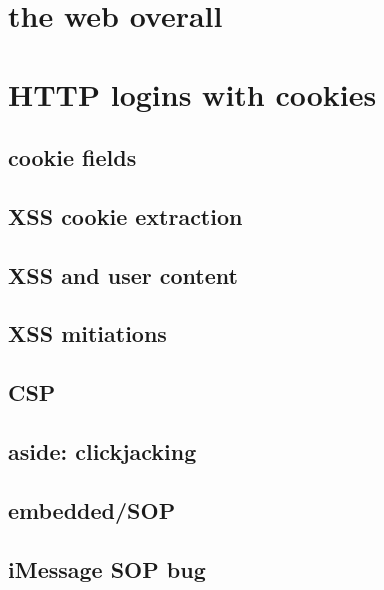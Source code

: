 
\usetikzlibrary{arrows.meta,calc,shapes.callouts,positioning}
\section{the web overall}




%
\section{HTTP logins with cookies}


\subsection{cookie fields}


\subsection{XSS cookie extraction}




\subsection{XSS and user content}


\subsection{XSS mitiations}


\subsection{CSP}


\subsection{aside: clickjacking}


\subsection{embedded/SOP}


\subsection{iMessage SOP bug}


